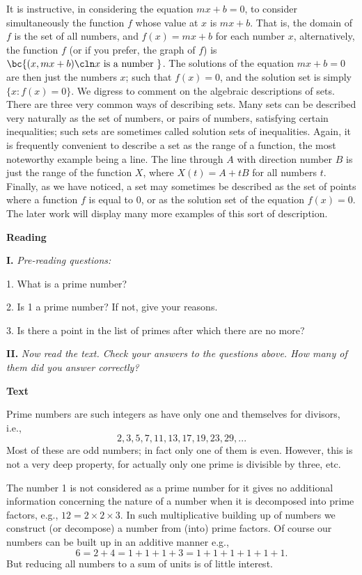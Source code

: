 \documentclass[a4paper]{article}
\newcounter{EUnits}
\newcommand{\EUnit}{\par\medskip{\huge \textbf{Unit \arabic{EUnits}}}\par\stepcounter{EUnits}}
\newcommand{\ESect}[1]{\medskip\par{\large \textbf{#1}}\par}
\newcommand{\ETask}[2]{\medskip\par\textbf{#1.} \textit{#2}\par}
\begin{document}
It is instructive, in considering the equation $mx+b=0$, to consider simultaneously the function $f$ whose value at $x$ is
$mx + b$. That is, the domain of $f$ is the set of all numbers, and $f(x)=mx+b$ for each number $x$, alternatively, the function
$f$ (or if you prefer, the graph of $f$) is $\bc{(x,mx+b)\cln x \text{ is a number }}$. The solutions of the equation $mx + b = 0$
are then just the numbers $x$; such that $f(x)=0$, and the solution set is simply $\{x: f(x) = 0\}$. We digress to comment
on the algebraic descriptions of sets. There are three very common ways of describing sets. Many sets can be described very
naturally as the set of numbers, or pairs of numbers, satisfying certain inequalities; such sets are sometimes called solution
sets of inequalities. Again, it is frequently convenient to describe a set as the range of a function, the most noteworthy
example being a line. The line through $A$ with direction number $B$ is just the range of the function $X$, where $X(t) = A + tB$
for all numbers $t$. Finally, as we have noticed, a set may sometimes be described as the set of points where a function $f$ is
equal to 0, or as the solution set of the equation $f(x) = 0$. The later work will display many more examples of this sort
of description.

\EUnit

\ESect{Reading}
\ETask{I}{Pre-reading questions:}
1. What is a prime number?

2. Is 1 a prime number? If not, give your reasons.

3. Is there a point in the list of primes after which there are no more?

\ETask{II}{Now read the text. Check your answers to the questions above. How many of them did you answer correctly?}

\ESect{Text}
Prime numbers are such integers as have only one and themselves for divisors, i.e., $$2, 3, 5, 7, 11, 13, 17, 19, 23, 29,...$$
Most of these are odd numbers; in fact only one of them is even. However, this is not a very deep property, for actually only
one prime is divisible by three, etc.

The number 1 is not considered as a prime number for it gives no additional information concerning the nature of a number when
it is decomposed into prime factors, e.g., $12=2\times 2 \times 3$. In such multiplicative building up of numbers we construct
(or decompose) a number from (into) prime factors. Of course our numbers can be built up in an additive manner e.g.,
$$6=2+4=1+1+1+3=1+1+1+1+1+1.$$ But reducing all numbers to a sum of units is of little interest.
\end{document}
